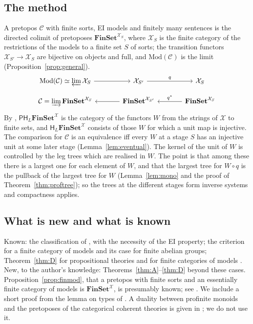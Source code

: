 \documentclass[11pt]{amsart}
\theoremstyle{definition}
\newcommand{\Fin}{\mathbf{FinSet}}
\newcommand{\Mod}{\mathrm{Mod}}
\newcommand{\PP}{\mathsf P}
\newcommand{\HH}{\mathsf H}
\newcommand{\cX}{\mathcal X}
\newcommand{\cC}{\mathcal C}
\begin{document}
\subsection*{The method}
A pretopos $\cC$ with finite sorts, EI models and finitely many
sentences is the directed colimit of pretoposes $\Fin^{\cX_S}$, where
$\cX_S$ is the finite category of the restrictions of the models to a
finite set $S$ of sorts; the transition functors $\cX_{S'}\to\cX_S$
are bijective on objects and full, and $\Mod(\cC)$ is the limit
(Proposition~\ref{prop:general}).
\[
\begin{tikzcd}[column sep=large,row sep=small]
\Mod(\cC)\simeq\varprojlim\cX_S\ar[r]&\cX_{S'}\ar[r,"q"]&\cX_S\\
\cC=\varinjlim\Fin^{\cX_S}&\Fin^{\cX_{S'}}\ar[l]&\Fin^{\cX_S}\ar[l,"q^*"']
\end{tikzcd}
\]
By \cite{Strings}, $\PP\HH_L\Fin^{\cX}$ is the category of the functors
$W$ from the strings of $\cX$ to finite sets, and $\HH_L\Fin^\cX$
consists of those $W$ for which a unit map is injective. The
comparison for $\cC$ is an equivalence iff every $W$ at a stage $S$
has an injective unit at some later stage (Lemma~\ref{lem:eventual}).
The kernel of the unit of $W$ is controlled by the leg trees which are
realised in $W$. The point is that among these there is a largest one
for each element of $W$, and that the largest tree for $W\circ q$ is
the pullback of the largest tree for $W$
(Lemma~\ref{lem:mono} and the proof of Theorem~\ref{thm:proftree}); so the trees at the different stages form
inverse systems and compactness applies.

\subsection*{What is new and what is known}
Known: the classification of \cite{Finsorts}, with the necessity of
the EI property; the criterion for a finite category of models
\cite[Thm.~1.1, Thm.~6.15]{Strings} and its case
\cite[Prop.~6.11]{Strings} for finite abelian groups;
Theorem~\ref{thm:D} for propositional theories \cite{Interm} and for
finite categories of models \cite[Cor.~6.5]{Strings}. New, to the
author's knowledge: Theorems~\ref{thm:A}--\ref{thm:D} beyond these
cases. Proposition~\ref{prop:finmod}, that a pretopos with finite
sorts and an essentially finite category of models is $\Fin^\cX$, is
presumably known; see \cite[Cor.~2.6]{Ye24}. We include a short proof
from the lemma on types of \cite{Finsorts}. A duality between
profinite monoids and the pretoposes of the categorical coherent
theories is given in \cite{Ye26}; we do not use it.
\end{document}
